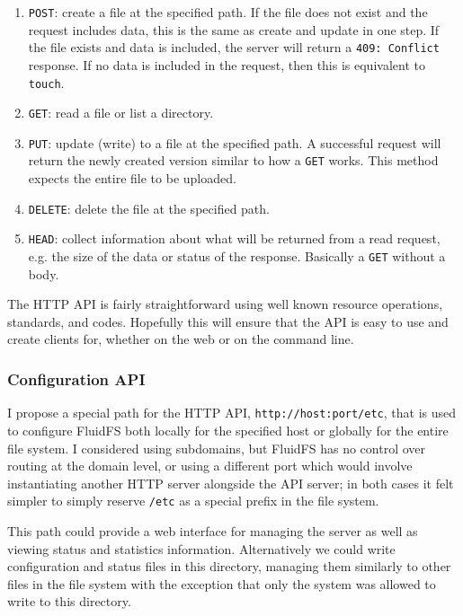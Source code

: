 \documentclass[letterpaper,twocolumn,10pt]{article}
\begin{document}
\begin{enumerate}
    \item \texttt{POST}: create a file at the specified path. If the file
    does not exist and the request includes data, this is the same as create
    and update in one step. If the file exists and data is included, the
    server will return a \texttt{409: Conflict} response. If no data is
    included in the request, then this is equivalent to \texttt{touch}.
    \item \texttt{GET}: read a file or list a directory.
    \item \texttt{PUT}: update (write) to a file at the specified path. A
    successful request will return the newly created version similar to how a
    \texttt{GET} works. This method expects the entire file to be uploaded.
    \item \texttt{DELETE}: delete the file at the specified path.
    \item \texttt{HEAD}: collect information about what will be returned from
    a read request, e.g. the size of the data or status of the response.
    Basically a \texttt{GET} without a body.
\end{enumerate}

The HTTP API is fairly straightforward using well known resource operations,
standards, and codes.
Hopefully this will ensure that the API is easy to use and create clients
for, whether on the web or on the command line.

\subsubsection*{Configuration API}

I propose a special path for the HTTP API, \texttt{http://host:port/etc}, that
is used to configure FluidFS both locally for the specified host or globally
for the entire file system.
I considered using subdomains, but FluidFS has no control over routing at the
domain level, or using a different port which would involve instantiating
another HTTP server alongside the API server; in both cases it felt simpler
to simply reserve \texttt{/etc} as a special prefix in the file system.

This path could provide a web interface for managing the server as well as
viewing status and statistics information.
Alternatively we could write configuration and status files in this
directory, managing them similarly to other files in the file system with the
exception that only the system was allowed to write to this directory.

{\footnotesize 
}
\end{document}
